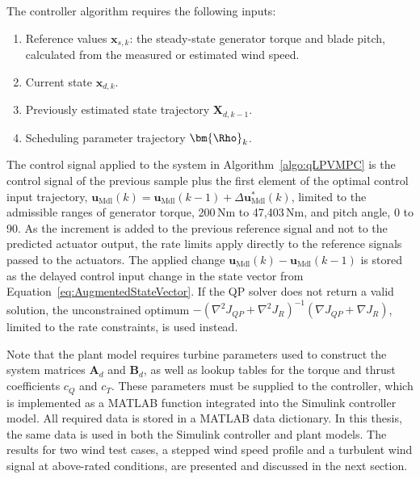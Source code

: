 The controller algorithm requires the following inputs:
\begin{enumerate}
    \item Reference values \(\bm{x}_{s,k}\): the steady-state generator torque and blade pitch, calculated from the measured or estimated wind speed.
    \item Current state \(\bm{x}_{d,k}\).
    \item Previously estimated state trajectory \(\bm{X}_{d,k-1}\).
    \item Scheduling parameter trajectory \(\bm{\Rho}_k\).
\end{enumerate}

The control signal applied to the system in Algorithm~\ref{algo:qLPVMPC} is the control signal of the previous sample plus the first element of the optimal control input trajectory, $\bm{u}_{\text{Mdl}}(k) = \bm{u}_{\text{Mdl}}(k-1) + \Delta \bm{u}^*_{\text{Mdl}}(k)$, limited to the admissible ranges of generator torque, 200\,Nm to 47,403\,Nm, and pitch angle, 0\textdegree{} to 90\textdegree{}. As the increment is added to the previous reference signal and not to the predicted actuator output, the rate limits apply directly to the reference signals passed to the actuators. The applied change $\bm{u}_{\text{Mdl}}(k) - \bm{u}_{\text{Mdl}}(k-1)$ is stored as the delayed control input change in the state vector from Equation~\eqref{eq:AugmentedStateVector}. If the QP solver does not return a valid solution, the unconstrained optimum $-\left(\nabla^2 J_{QP} + \nabla^2 J_R\right)^{-1}\left(\nabla J_{QP} + \nabla J_R\right)$, limited to the rate constraints, is used instead.

Note that the plant model requires turbine parameters used to construct the system matrices \(\bm{A}_d\) and \(\bm{B}_d\), as well as lookup tables for the torque and thrust coefficients \(c_Q\) and \(c_T\). These parameters must be supplied to the controller, which is implemented as a MATLAB function integrated into the Simulink controller model. All required data is stored in a MATLAB data dictionary. In this thesis, the same data is used in both the Simulink controller and plant models. The results for two wind test cases, a stepped wind speed profile and a turbulent wind signal at above-rated conditions, are presented and discussed in the next section.

